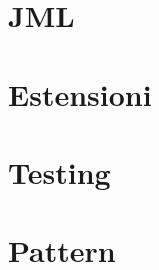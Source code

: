 \providecommand{\main}{.}


\renewcommand{\bs}{\textbackslash}






{\hypersetup{hidelinks}
  \tableofcontents  %
}

\chapter{JML}


\chapter{Estensioni}


\chapter{Testing}


\chapter{Pattern}



\appendix
%



